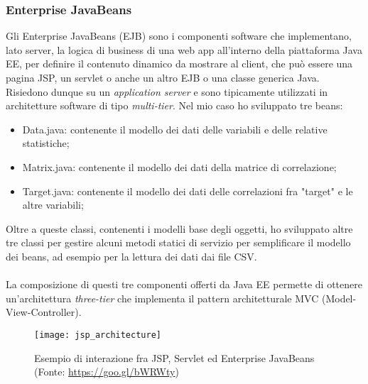 \subsubsection{Enterprise JavaBeans}
Gli Enterprise JavaBeans (EJB) sono i componenti software che implementano, lato server, la logica di business di una \gls{web app} all'interno della piattaforma Java EE, per definire il contenuto dinamico da mostrare al client, che può essere una pagina JSP, un servlet o anche un altro EJB o una classe generica Java. Risiedono dunque su un \textit{application server} e sono tipicamente utilizzati in architetture software di tipo \textit{multi-tier}.
Nel mio caso ho sviluppato tre beans:
\begin{itemize}
	\item Data.java: contenente il modello dei dati delle variabili e delle relative statistiche;
	\item Matrix.java: contenente il modello dei dati della matrice di correlazione;
	\item Target.java: contenente il modello dei dati delle correlazioni fra "target" e le altre variabili;
\end{itemize}

Oltre a queste classi, contenenti i modelli base degli oggetti, ho sviluppato altre tre classi per gestire alcuni metodi statici di servizio per semplificare il modello dei beans, ad esempio per la lettura dei dati dai file \gls{CSV}.\\\\
La composizione di questi tre componenti offerti da Java EE permette di ottenere un'architettura \textit{three-tier} che implementa il pattern architetturale MVC (Model-View-Controller).
\begin{figure}[!h]
	\centering
	\texttt{[image: jsp\_architecture]}
	\caption{Esempio di interazione fra JSP, Servlet ed Enterprise JavaBeans (Fonte: \href{https://goo.gl/bWRWty}{https://goo.gl/bWRWty})}
\end{figure}

\clearpage
